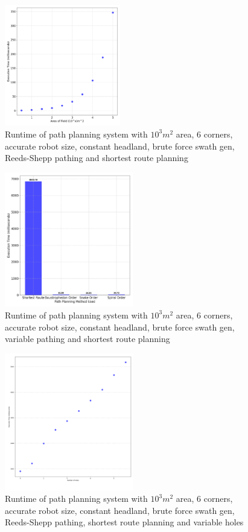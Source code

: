 \documentclass[final]{cmpreport_02}
\begin{document}
\begin{figure}[h!]
	\centering
	\includegraphics[width=0.45\textwidth]{./images/pathingSizeRt.png}
	\caption{Runtime of path planning system with $10^3m^2$ area, 6 corners, accurate robot size, constant headland, brute force swath gen, Reeds-Shepp pathing and shortest route planning}
	\label{PE:p:SizeRT}
\end{figure}


\begin{figure}[h!]
	\centering
	\includegraphics[width=0.5\textwidth]{./images/pathingRoutePlanningRT.png}
	\caption{Runtime of path planning system with $10^3m^2$ area, 6 corners, accurate robot size, constant headland, brute force swath gen, variable pathing and shortest route planning}
	\label{PE:p:RoutePlanningRT}
\end{figure}


\begin{figure}[h!]
	\centering
	\includegraphics[width=0.5\textwidth]{./images/pathingHolesRT.png}
	\caption{Runtime of path planning system with $10^3m^2$ area, 6 corners, accurate robot size, constant headland, brute force swath gen, Reeds-Shepp pathing, shortest route planning and variable holes}
	\label{PE:p:HolesRT}
\end{figure}
\end{document}
